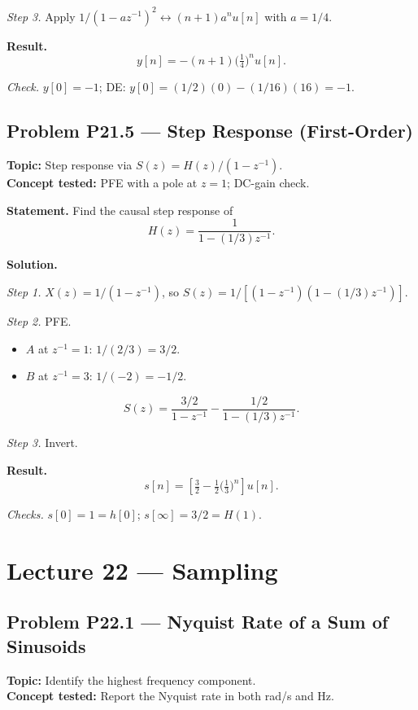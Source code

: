 \documentclass[11pt]{article}
\begin{document}
\textit{Step 3.} Apply $1/(1-az^{-1})^{2}\leftrightarrow (n+1)a^{n}u[n]$ with $a=1/4$.

\textbf{Result.}
\[
\boxed{\,y[n] = -(n+1)\bigl(\tfrac{1}{4}\bigr)^{n}u[n].\,}
\]

\textit{Check.} $y[0] = -1$; DE: $y[0] = (1/2)(0)-(1/16)(16) = -1$. \checkmark

\subsection{Problem P21.5 --- Step Response (First-Order)}
\textbf{Topic:} Step response via $S(z) = H(z)/(1-z^{-1})$.\\
\textbf{Concept tested:} PFE with a pole at $z=1$; DC-gain check.

\textbf{Statement.} Find the causal step response of
\[
H(z) = \frac{1}{1-(1/3)z^{-1}}.
\]

\textbf{Solution.}

\textit{Step 1.} $X(z) = 1/(1-z^{-1})$, so
$S(z) = 1/[(1-z^{-1})(1-(1/3)z^{-1})]$.

\textit{Step 2.} PFE.
\begin{itemize}
\item $A$ at $z^{-1}=1$: $1/(2/3) = 3/2$.
\item $B$ at $z^{-1}=3$: $1/(-2) = -1/2$.
\end{itemize}
\[
S(z) = \frac{3/2}{1-z^{-1}}-\frac{1/2}{1-(1/3)z^{-1}}.
\]

\textit{Step 3.} Invert.

\textbf{Result.}
\[
\boxed{\,s[n] = \left[\tfrac{3}{2}-\tfrac{1}{2}\bigl(\tfrac{1}{3}\bigr)^{n}\right]u[n].\,}
\]

\textit{Checks.} $s[0]=1=h[0]$; $s[\infty]=3/2=H(1)$. \checkmark

\section{Lecture 22 --- Sampling}

\subsection{Problem P22.1 --- Nyquist Rate of a Sum of Sinusoids}
\textbf{Topic:} Identify the highest frequency component.\\
\textbf{Concept tested:} Report the Nyquist rate in both rad/s and Hz.
\end{document}
